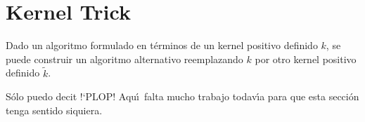 \section{Kernel Trick}

\begin{mydef}
Dado un algoritmo formulado en t\'erminos de un kernel positivo
definido $k$, se puede construir un algoritmo alternativo
reemplazando $k$ por otro kernel positivo definido $\tilde{k}$.
\end{mydef}

\begin{myremark}
S\'olo puedo decit !`PLOP!
Aqu\'\i\ falta mucho trabajo todav\'\i a para que esta secci\'on
tenga sentido siquiera.
\end{myremark}

